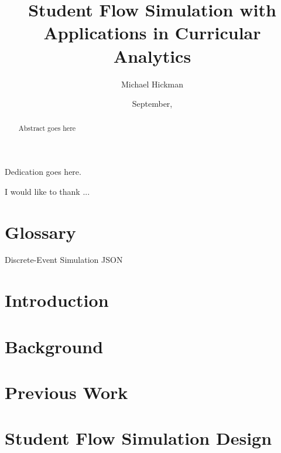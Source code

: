 \documentclass[botnum, fleqn]{unmeethesis}
\begin{document}
\frontmatter

\title{Student Flow Simulation with Applications in Curricular Analytics}
\author{Michael Hickman}
\date{September, \thisyear}

\maketitle
\makecopyright


\begin{dedication}
  Dedication goes here.
\end{dedication}


\begin{acknowledgments}
  \vspace{1.1in}
  I would like to thank ...
\end{acknowledgments}


\maketitleabstract

\begin{abstract}
  Abstract goes here
  \clearpage
\end{abstract}


\tableofcontents
\listoffigures


\chapter{Glossary}
Discrete-Event Simulation
JSON
\mainmatter


\chapter{Introduction}


\chapter{Background}


\chapter{Previous Work}


\chapter{Student Flow Simulation Design}
\end{document}
